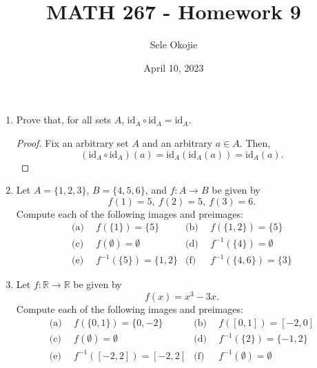 \documentclass{article}
\title{MATH 267 - Homework 9}
\author{Sele Okojie}
\date{April 10, 2023}
\begin{document}
    \maketitle

    \begin{enumerate}

        \item Prove that, for all sets $A$, $\mathrm{id}_A \circ \mathrm{id}_A = \mathrm{id}_A$.
            \begin{proof}
                Fix an arbitrary set $A$ and an arbitrary $a\in A$. Then,
                \[
                    (\mathrm{id}_A \circ \mathrm{id}_A)(a) = \mathrm{id}_A(\mathrm{id}_A(a)) = \mathrm{id}_A(a).
                \]
            \end{proof}

	\item Let $A = \{ 1, 2, 3 \}$, $B = \{ 4, 5, 6 \}$, and $f : A \rightarrow B$ be given by
		\[
			f(1) = 5, \ f(2) = 5, \ f(3) = 6.
		\]
		Compute each of the following images and preimages:
		\begin{align*}
			\text{(a)} & \ \ f(\{ 1 \}) = \{ 5 \} & \text{(b)} & \ \ f(\{ 1, 2 \}) = \{ 5 \} \\
			\text{(c)} & \ \ f( \emptyset ) = \emptyset & \text{(d)} & \ \ f^{\minus1}(\{ 4 \}) = \emptyset \\
			\text{(e)} & \ \ f^{\minus1}(\{ 5 \}) = \{ 1, 2 \} & \text{(f)} & \ \ f^{\minus1}(\{ 4, 6 \}) = \{ 3 \}
		\end{align*}

	\item Let $f : \mathbb{R} \rightarrow \mathbb{R}$ be given by
		\[
			f(x) = x^3 - 3x.
		\]
		Compute each of the following images and preimages:
		\begin{align*}
			\text{(a)} & \ \ f(\{0, 1\}) = \{ 0, \minus2 \} & \text{(b)} & \ \ f([0,1]) = [\minus2, 0] \\
			\text{(c)} & \ \ f(\emptyset) = \emptyset & \text{(d)} & \ \ f^{\minus1}(\{ 2 \}) = \{ \minus1, 2 \} \\
			\text{(e)} & \ \ f^{\minus1}([-2,2]) = [\minus2, 2] & \text{(f)} & \ \ f^{\minus1}(\emptyset) = \emptyset
		\end{align*}


\end{enumerate}
\end{document}

